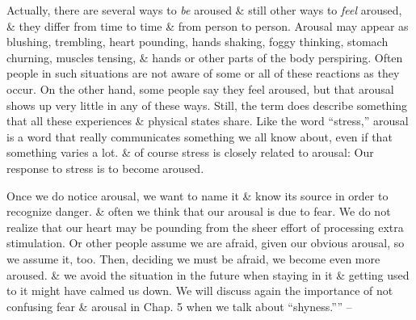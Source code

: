\documentclass{article}
\numberwithin{equation}{section}
\begin{document}
Actually, there are several ways to \textit{be} aroused \& still other ways to \textit{feel} aroused, \& they differ from time to time \& from person to person. Arousal may appear as blushing, trembling, heart pounding, hands shaking, foggy thinking, stomach churning, muscles tensing, \& hands or other parts of the body perspiring. Often people in such situations are not aware of some or all of these reactions as they occur. On the other hand, some people say they feel aroused, but that arousal shows up very little in any of these ways. Still, the term does describe something that all these experiences \& physical states share. Like the word ``stress,'' arousal is a word that really communicates something we all know about, even if that something varies a lot. \& of course stress is closely related to arousal: Our response to stress is to become aroused.

Once we do notice arousal, we want to name it \& know its source in order to recognize danger. \& often we think that our arousal is due to fear. We do not realize that our heart may be pounding from the sheer effort of processing extra stimulation. Or other people assume we are afraid, given our obvious arousal, so we assume it, too. Then, deciding we must be afraid, we become even more aroused. \& we avoid the situation in the future when staying in it \& getting used to it might have calmed us down. We will discuss again the importance of not confusing fear \& arousal in Chap. 5 when we talk about ``shyness.'''' -- \cite[pp. 43--44]{Aron2013}
\end{document}
